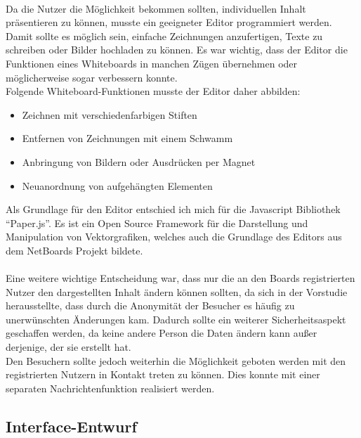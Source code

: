 \\
Da die Nutzer die Möglichkeit bekommen sollten, individuellen Inhalt präsentieren zu können, musste ein geeigneter Editor programmiert werden.
Damit sollte es möglich sein, einfache Zeichnungen anzufertigen, Texte zu schreiben oder Bilder hochladen zu können.
Es war wichtig, dass der Editor die Funktionen eines Whiteboards in manchen Zügen übernehmen oder möglicherweise sogar verbessern konnte.
\\
Folgende Whiteboard-Funktionen musste der Editor daher abbilden:
\begin{itemize}
  \item Zeichnen mit verschiedenfarbigen Stiften
  \item Entfernen von Zeichnungen mit einem Schwamm
  \item Anbringung von Bildern oder Ausdrücken per Magnet
  \item Neuanordnung von aufgehängten Elementen
\end{itemize}
Als Grundlage für den Editor entschied ich mich für die Javascript Bibliothek ``Paper.js''\cite{paperjs:website}.
Es ist ein Open Source Framework für die Darstellung und Manipulation von Vektorgrafiken, welches auch die Grundlage des Editors aus dem NetBoards Projekt bildete\cite{wood:2014}.
\\
\\
Eine weitere wichtige Entscheidung war, dass nur die an den Boards registrierten Nutzer den dargestellten Inhalt ändern können sollten, da sich in der Vorstudie herausstellte, dass durch die Anonymität der Besucher es häufig zu unerwünschten Änderungen kam.
Dadurch sollte ein weiterer Sicherheitsaspekt geschaffen werden, da keine andere Person die Daten ändern kann außer derjenige, der sie erstellt hat.
\\
Den Besuchern sollte jedoch weiterhin die Möglichkeit geboten werden mit den registrierten Nutzern in Kontakt treten zu können. Dies konnte mit einer separaten Nachrichtenfunktion realisiert werden.











\subsection{Interface-Entwurf}\label{Interface-Entwurf}
